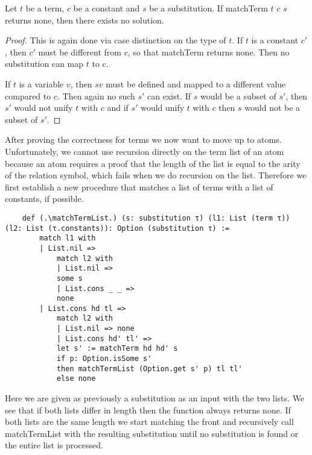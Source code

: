 \begin{lemma}[\matchTermNoneImpNoSolution]
    Let $t$ be a term, $c$ be a constant and $s$ be a substitution. If matchTerm $t$ $c$ $s$ returns none, then there exists no solution.
\end{lemma}
\begin{proof}
This is again done via case distinction on the type of $t$. If $t$ is a constant $c'$, then $c'$ must be different from $c$, so that matchTerm returns none. Then no substitution can map $t$ to c.

If $t$ is a variable $v$, then $s v$ must be defined and mapped to a different value compared to $c$. Then again no such $s'$ can exist. If $s$ would be a subset of $s'$, then $s'$ would not unify $t$ with $c$ and if $s'$ would unify $t$ with $c$ then $s$ would not be a subset of $s'$.
\end{proof}

After proving the correctness for terms we now want to move up to atoms. Unfortunately, we cannot use recursion directly on the term list of an atom because an atom requires a proof that the length of the list is equal to the arity of the relation symbol, which fails when we do recursion on the list. Therefore we first establish a new procedure that matches a list of terms with a list of constants, if possible.

\begin{lstlisting}
    def (.\matchTermList.) (s: substitution τ) (l1: List (term τ)) (l2: List (τ.constants)): Option (substitution τ) :=
        match l1 with
        | List.nil =>
            match l2 with
            | List.nil =>
            some s
            | List.cons _ _ =>
            none
        | List.cons hd tl =>
            match l2 with
            | List.nil => none
            | List.cons hd' tl' =>
            let s' := matchTerm hd hd' s
            if p: Option.isSome s'
            then matchTermList (Option.get s' p) tl tl'
            else none
\end{lstlisting}

Here we are given as previously a substitution as an input with the two lists. We see that if both lists differ in length then the function always returns none.
If both lists are the same length we start matching the front and recursively call matchTermList with the resulting substitution until no substitution is found or the entire list is processed.

